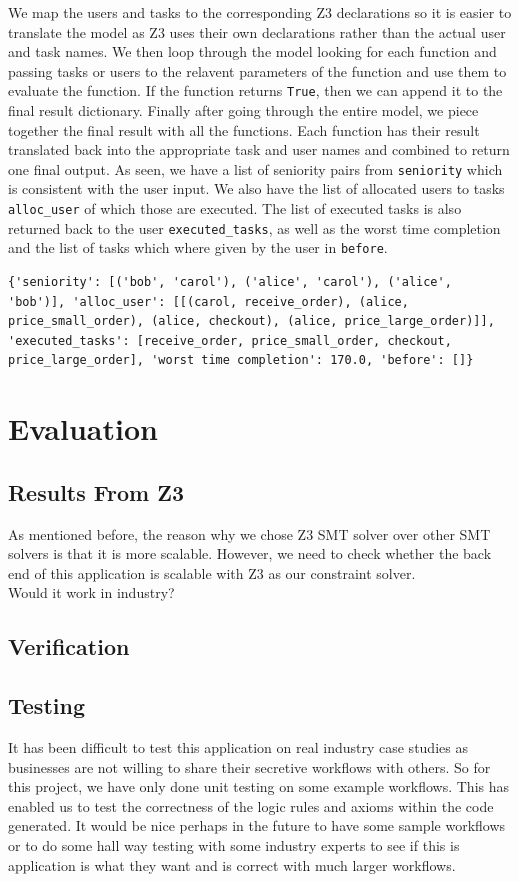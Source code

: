 \documentclass[a4paper]{report}
\begin{document}
We map the users and tasks to the corresponding Z3 declarations so it is easier to translate the model as Z3 uses their own declarations rather than the actual user and task names. We then loop through the model looking for each function and passing tasks or users to the relavent parameters of the function and use them to evaluate the function. If the function returns \texttt{True}, then we can append it to the final result dictionary. Finally after going through the entire model, we piece together the final result with all the functions. Each function has their result translated back into the appropriate task and user names and combined to return one final output. As seen, we have a list of seniority pairs from \texttt{seniority} which is consistent with the user input. We also have the list of allocated users to tasks \texttt{alloc\_user} of which those are executed. The list of executed tasks is also returned back to the user \texttt{executed\_tasks}, as well as the worst time completion and the list of tasks which where given by the user in \texttt{before}.

\begin{lstlisting}[frame=single]
{'seniority': [('bob', 'carol'), ('alice', 'carol'), ('alice', 'bob')], 'alloc_user': [[(carol, receive_order), (alice, price_small_order), (alice, checkout), (alice, price_large_order)]], 'executed_tasks': [receive_order, price_small_order, checkout, price_large_order], 'worst time completion': 170.0, 'before': []}
\end{lstlisting}

\chapter{Evaluation}
\section{Results From Z3}
As mentioned before, the reason why we chose Z3 SMT solver over other SMT solvers is that it is more scalable. However, we need to check whether the back end of this application is scalable with Z3 as our constraint solver. \\

Would it work in industry?

\section{Verification}

\section{Testing}
It has been difficult to test this application on real industry case studies as businesses are not willing to share their secretive workflows with others. So for this project, we have only done unit testing on some example workflows. This has enabled us to test the correctness of the logic rules and axioms within the code generated. It would be nice perhaps in the future to have some sample workflows or to do some hall way testing with some industry experts to see if this is application is what they want and is correct with much larger workflows.
\end{document}
